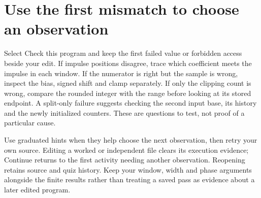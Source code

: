 \section{Use the first mismatch to choose an observation}

Select Check this program and keep the first failed value or forbidden access
beside your edit. If impulse positions disagree, trace which coefficient meets
the impulse in each window. If the numerator is right but the sample is wrong,
inspect the bias, signed shift and clamp separately. If only the clipping count
is wrong, compare the rounded integer with the range before looking at its
stored endpoint. A split-only failure suggests checking the second input base,
its history and the newly initialized counters. These are questions to test,
not proof of a particular cause.

Use graduated hints when they help choose the next observation, then retry your
own source. Editing a worked or independent file clears its execution evidence;
Continue returns to the first activity needing another observation. Reopening
retains source and quiz history. Keep your window, width and phase arguments
alongside the finite results rather than treating a saved pass as evidence about
a later edited program.
